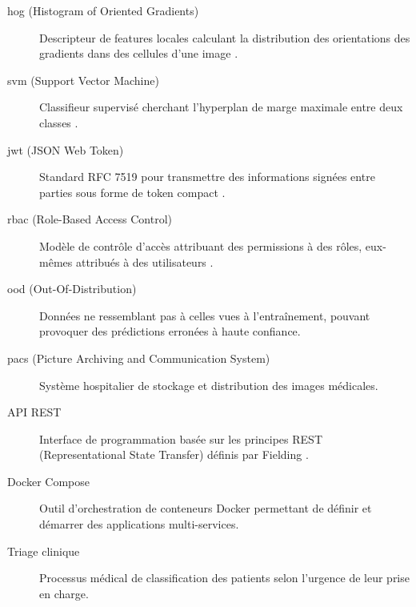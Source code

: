 \documentclass[12pt, a4paper]{report}
\begin{document}
\begin{description}
  \item[\acrshort{hog} (Histogram of Oriented Gradients)]
    Descripteur de features locales calculant la distribution des orientations
    des gradients dans des cellules d'une image \cite{dalal2005}.
  \item[\acrshort{svm} (Support Vector Machine)]
    Classifieur supervisé cherchant l'hyperplan de marge maximale
    entre deux classes \cite{cortes1995}.
  \item[\acrshort{jwt} (JSON Web Token)]
    Standard RFC 7519 pour transmettre des informations signées entre parties
    sous forme de token compact \cite{jones2015}.
  \item[\acrshort{rbac} (Role-Based Access Control)]
    Modèle de contrôle d'accès attribuant des permissions à des rôles,
    eux-mêmes attribués à des utilisateurs \cite{sandhu1996}.
  \item[\acrshort{ood} (Out-Of-Distribution)]
    Données ne ressemblant pas à celles vues à l'entraînement,
    pouvant provoquer des prédictions erronées à haute confiance.
  \item[\acrshort{pacs} (Picture Archiving and Communication System)]
    Système hospitalier de stockage et distribution des images médicales.
  \item[API REST]
    Interface de programmation basée sur les principes REST (Representational
    State Transfer) définis par Fielding \cite{fielding2000}.
  \item[Docker Compose]
    Outil d'orchestration de conteneurs Docker permettant de définir
    et démarrer des applications multi-services.
  \item[Triage clinique]
    Processus médical de classification des patients selon l'urgence
    de leur prise en charge.
\end{description}
\end{document}
